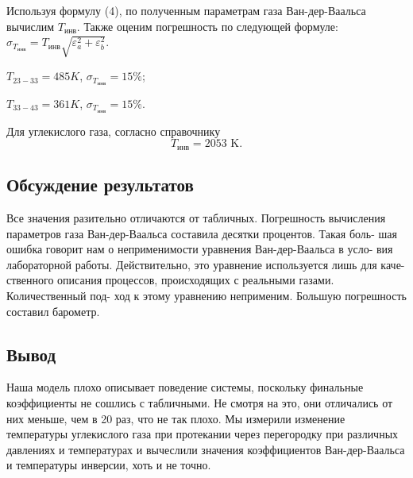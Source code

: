 \documentclass[a4paper, 12pt]{article}
\begin{document}
Используя формулу (4), по полученным параметрам газа Ван-дер-Ваальса вычислим $ T_\text{инв} $. Также оценим погрешность по следующей формуле:
$\displaystyle \sigma_{T_\text{инв}} = T_\text{инв}\sqrt{\varepsilon^2_a+\varepsilon_b^2}.$

\begin{center}
    $\displaystyle T_{23-33} = 485 K$, $\displaystyle \sigma_{T_{\text{инв}}} = 15\%$; \break
    
    $\displaystyle T_{33-43} = 361 K$, $\displaystyle \sigma_{T_{\text{инв}}} = 15\%$.
\end{center}

Для углекислого газа, согласно справочнику  \[ T_\text{инв} = 2053 \text{ K}.\]

\begin{center}
	\section*{Обсуждение результатов}
\end{center}

\bigskip

Все значения разительно отличаются от табличных. Погрешность вычисления параметров газа Ван-дер-Ваальса составила десятки процентов. Такая боль-
шая ошибка говорит нам о неприменимости уравнения Ван-дер-Ваальса в усло-
вия лабораторной работы. Действительно, это уравнение используется лишь для каче-
ственного описания процессов, происходящих с реальными газами. Количественный под-
ход к этому уравнению неприменим. Большую погрешность составил барометр.

\bigskip

\begin{center}
	\section*{Вывод}
\end{center}

Наша модель плохо описывает поведение системы, поскольку финальные коэффициенты не сошлись с табличными. Не смотря на это, они отличались от них меньше, чем в 20 раз, что не так плохо. Мы измерили изменение температуры углекислого газа при протекании через перегородку при различных давлениях и температурах и вычеслили значения коэффициентов Ван-дер-Ваальса и температуры инверсии, хоть и не точно.
\end{document}
